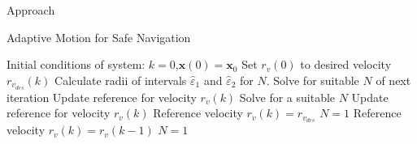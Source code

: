 \begin{section}{Approach}
\begin{algorithm}
   \caption{Adaptive Motion for Safe Navigation} 
   \label{alg:adapt_motion} 
    \begin{algorithmic}[1]
	\State Initial conditions of system: $k=0$,$\bm{x}(0)=\bm{x}_0$
	\State Set $r_v(0)$ to desired velocity $r_{v_{des}}(k)$
        \State {}
        \State Calculate radii of intervals $\hat{\varepsilon}_1$ and $\hat{\varepsilon}_2$ for $N$.
            \State Solve for suitable $N$ of next iteration
            \State Update reference for velocity $r_v(k)$
        \Else
                \State Solve for a suitable $N$
                \State Update reference for velocity $r_v(k)$
            \Else
                    \State Reference velocity $r_v(k)=r_{v_{des}}$
                    \State $N = 1$
                \Else
                    \State Reference velocity $r_v(k) = r_v(k-1)$
                    \State $N = 1$
                \EndIf
            \EndIf
        \EndIf
    \EndWhile
	\end{algorithmic}
\end{algorithm}



\end{section} 